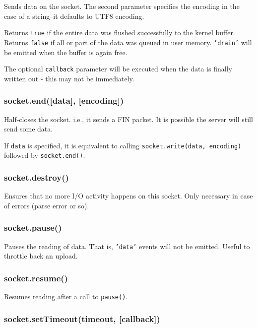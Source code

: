 Sends data on the socket. The second parameter specifies the encoding in
the case of a string--it defaults to UTF8 encoding.

Returns \texttt{true} if the entire data was flushed successfully to the
kernel buffer. Returns \texttt{false} if all or part of the data was
queued in user memory. \texttt{'drain'} will be emitted when the buffer
is again free.

The optional \texttt{callback} parameter will be executed when the data
is finally written out - this may not be immediately.

\subsubsection{socket.end({[}data{]},
{[}encoding{]})}\label{socket.enddata-encoding}

Half-closes the socket. i.e., it sends a FIN packet. It is possible the
server will still send some data.

If \texttt{data} is specified, it is equivalent to calling
\texttt{socket.write(data, encoding)} followed by \texttt{socket.end()}.

\subsubsection{socket.destroy()}\label{socket.destroy}

Ensures that no more I/O activity happens on this socket. Only necessary
in case of errors (parse error or so).

\subsubsection{socket.pause()}\label{socket.pause}

Pauses the reading of data. That is, \texttt{'data'} events will not be
emitted. Useful to throttle back an upload.

\subsubsection{socket.resume()}\label{socket.resume}

Resumes reading after a call to \texttt{pause()}.

\subsubsection{socket.setTimeout(timeout,
{[}callback{]})}\label{socket.settimeouttimeout-callback}

